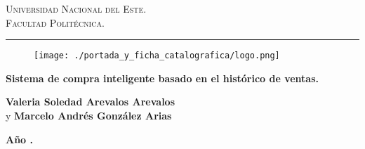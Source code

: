 \documentclass[12pt,a4paper,oneside]{book}
\begin{document}
\renewcommand{\glossaryname}{Glosario}

\renewcommand\listtablename{\'Indice de Tablas}

\renewcommand{\tablename}{Tabla}
\renewcommand{\acronymname}{Acr\'onimos y s\'imbolos}
\renewcommand{\bibname}{Referencias bibliogr\'aficas}
\frontmatter
\vspace*{-3cm}

\thispagestyle{empty}

{\bf
\begin{center}
\large
\vspace*{-1 cm}\Large \textsc{Universidad Nacional del Este.} \\
\Large \textsc{Facultad Politécnica.} \\
\vspace*{0.5 cm}\hrule
\end{center}
}

\vspace*{-0.5 cm}
\begin{figure}[htb]
\begin{center}
\texttt{[image: ./portada\_y\_ficha\_catalografica/logo.png]}

\end{center}
\end{figure}


\vspace{3 cm}
{
\noindent
\begin{center}
    
\huge \bf Sistema de compra inteligente basado en el histórico de ventas.
\end{center}
}


\vspace{6 cm}

\begin{center}
{\textbf{\Large Valeria Soledad Arevalos Arevalos}\\[5mm]
\hspace{0.5 cm} y \textbf{\Large Marcelo Andrés González Arias}
\vspace{0.5cm}

\textbf{Año \the\year.}}
\end{center}









\tableofcontents
\listoffigures
{}
\listoftables
{}
\printglossary[type=\acronymtype] %
{}
\mainmatter





\end{document}
